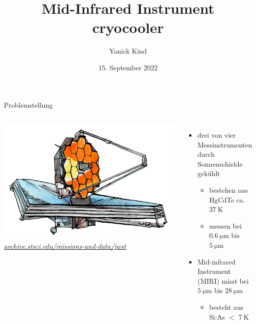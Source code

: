 \documentclass[aspectratio=1610, 9pt, xcolor=dvipsnames]{beamer}
\title{Mid-Infrared Instrument cryocooler}
\author[Y.~Kind]{Yanick Kind}
\institute[SoAk22]{Sommerakademie 2022}
\date{15. September 2022}
\begin{document}
\maketitle


\begin{frame}{Problemstellung}
  \begin{columns}
    \includegraphics[width = \textwidth]{Plots/sketch.png}
    \hspace*{12pt}\hbox{\scriptsize {\footnotesize\itshape \href{https://archive.stsci.edu/missions-and-data/jwst}
    {archive.stsci.edu/missions-and-data/jwst}}}
  \begin{itemize}
    \item drei von vier Messinstrumenten durch Sonnenschielde gekühlt 
    \begin{itemize}
      \item bestehen aus HgCdTe {\color{tugreen} \textrightarrow } ca. $\qty{37}{\kelvin}$
      \item messen bei $\qty{0.6}{\micro\metre}$ bis $\qty{5}{\micro\metre}$
    \end{itemize}
    \pause
    \item Mid-infrared Instrument (MIRI) misst bei $\qty{5}{\micro\metre}$ bis $\qty{28}{\micro\metre}$
    \begin{itemize}
      \item besteht aus Si:As {\color{tugreen} \textrightarrow } $<$ $\qty{7}{\kelvin}$
    \end{itemize}
  \end{itemize}
  \pause
  \vspace{0.5cm}
  \centering
\end{columns}
\end{frame}
\end{document}
